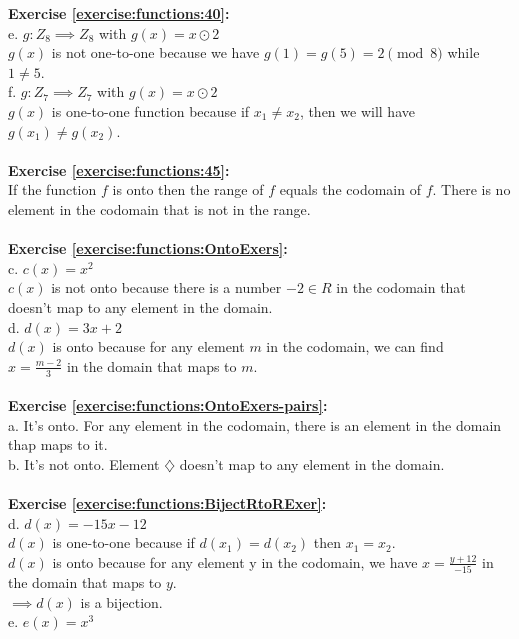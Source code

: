 \textbf{Exercise \ref{exercise:functions:40}:}\\
e. $g: Z_8 \implies Z_8$ with $g(x)=x\odot 2$\\
$g(x)$ is not one-to-one because we have $g(1)=g(5)=2 \pmod{8}$ while $1\neq 5$.\\
f. $g: Z_7 \implies Z_7$ with $g(x)=x\odot 2$\\
$g(x)$ is one-to-one function because if $x_1\neq x_2$, then we will have $g(x_1)\neq g(x_2)$.\\
\\
\textbf{Exercise \ref{exercise:functions:45}:}\\
If the function $f$ is onto then the range of $f$ equals the codomain of $f$. There is no element in the codomain that is not in the range.\\
\\
\textbf{Exercise \ref{exercise:functions:OntoExers}:}\\
c. $c(x)=x^2$\\
$c(x)$ is not onto because there is a number $-2 \in R$ in the codomain that doesn't map to any element in the domain.\\
d. $d(x)=3x+2$\\
$d(x)$ is onto because for any element $m$ in the codomain, we can find\\ $x=\displaystyle\frac{m-2}{3}$ in the domain that maps to $m$.\\
\\
\textbf{Exercise \ref{exercise:functions:OntoExers-pairs}:}\\
a. It's onto. For any element in the codomain, there is an element in the domain thap maps to it.\\
b. It's not onto. Element $\diamondsuit$ doesn't map to any element in the domain.\\
\\
\textbf{Exercise \ref{exercise:functions:BijectRtoRExer}:}\\
d. $d(x)=-15x-12$\\
$d(x)$ is one-to-one because if $d(x_1)=d(x_2)$ then $x_1=x_2$.\\
$d(x)$ is onto because for any element y in the codomain, we have $x=\displaystyle\frac{y+12}{-15}$ in the domain that maps to $y$.\\
$\implies d(x)$ is a bijection.\\
e. $e(x)=x^3$\\
